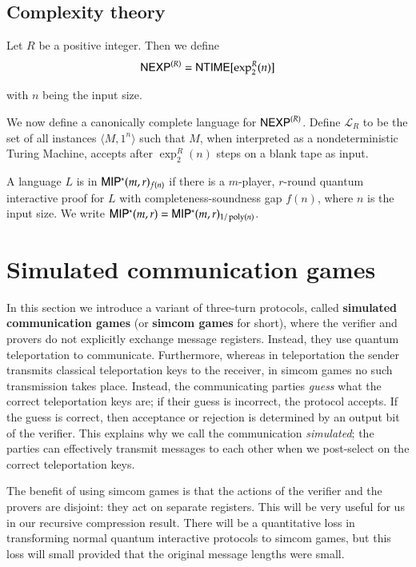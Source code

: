 \subsection{Complexity theory}

\begin{definition}
	Let $R$ be a positive integer. Then we define
	\[
		{\sf NEXP}^{(R)} = {\sf NTIME}[\exp^R_2(n)]
	\]
\end{definition}
with $n$ being the input size. 

We now define a canonically complete language for ${\sf NEXP}^{(R)}$. Define $\mathcal{L}_R$ to be the set of all instances $\langle M, 1^n \rangle$ such that $M$, when interpreted as a nondeterministic Turing Machine, accepts after $\exp^R_2(n)$ steps on a blank tape as input.

\begin{definition}[$\MIPstar$]
	A language $L$ is in ${\sf MIP^*}(m,r)_{f(n)}$ if there is a $m$-player, $r$-round quantum interactive proof for $L$ with completeness-soundness gap $f(n)$, where $n$ is the input size. We write ${\sf MIP^*}(m,r) = {\sf MIP^*}(m,r)_{1/\operatorname{poly}(n)}$.
\end{definition}





\section{Simulated communication games}

In this section we introduce a variant of three-turn protocols, called \textbf{simulated communication games} (or \textbf{simcom games} for short), where the verifier and provers do not explicitly exchange message registers. Instead, they use quantum teleportation to communicate. Furthermore, whereas in teleportation the sender transmits classical teleportation keys to the receiver, in simcom games no such transmission takes place. Instead, the communicating parties \emph{guess} what the correct teleportation keys are; if their guess is incorrect, the protocol accepts. If the guess is correct, then acceptance or rejection is determined by an output bit of the verifier. This explains why we call the communication \emph{simulated}; the parties can effectively transmit messages to each other when we post-select on the correct teleportation keys.

The benefit of using simcom games is that the actions of the verifier and the provers are disjoint: they act on separate registers. This will be very useful for us in our recursive compression result. There will be a quantitative loss in transforming normal quantum interactive protocols to simcom games, but this loss will small provided that the original message lengths were small. 

